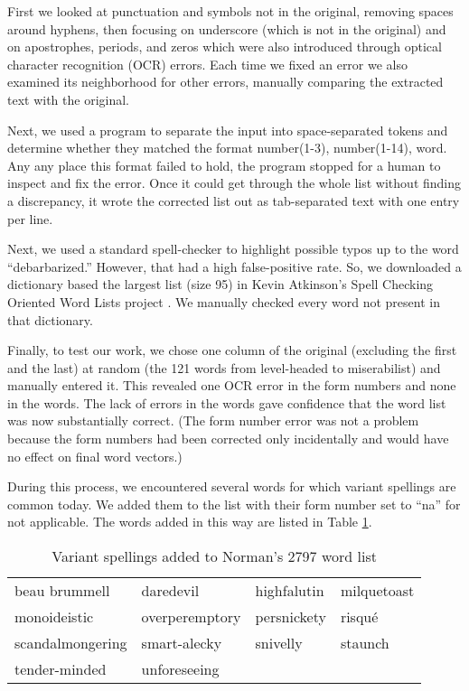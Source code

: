\documentclass[eric_thesis.tex]{subfiles}
\begin{document}
First we looked at
punctuation and symbols not in the original, removing spaces around hyphens, 
then focusing on underscore (which is not in the original) and on apostrophes, 
periods, and zeros which were also 
introduced through optical character recognition (OCR) errors. Each time we
fixed an error we also examined its neighborhood for other errors, manually
comparing the extracted text with the original. 

Next, we used a program to separate the input into space-separated tokens and
determine whether they matched the format number(1-3), number(1-14), word. Any
any place this format failed to hold, the program stopped for a human to 
inspect 
and fix the error. Once it could get through the whole list without finding a
discrepancy, it wrote the corrected list out as tab-separated text with one
entry per line.

Next, we used a standard spell-checker to highlight
possible typos up to the word ``debarbarized.'' However, that had a high 
false-positive rate. So, we downloaded
a dictionary based the largest list (size 95) in Kevin Atkinson's Spell 
Checking Oriented Word Lists project . We 
manually checked every word not present in that dictionary.

Finally, to test our work, we chose one column of the original (excluding the 
first and the last) at random (the 121 words from level-headed to miserabilist) 
and manually entered it. This revealed one OCR error in the form numbers and 
none in the words. The lack of errors in the words gave confidence that the 
word list was now substantially correct. (The form number error was not a 
problem because the form numbers had been corrected only incidentally and would 
have no effect on final word vectors.)

During this process, we encountered several words for which variant spellings
are common today. We added them to the list with their form number set to ``na''
for not applicable. The words added in this way are listed in Table 
\ref{tab:2797variantspellings}.

\begin{table}[tbp]
    \begin{tabular}{| llll |}
        \hline
        beau brummell & daredevil & highfalutin & milquetoast \\
        monoideistic & overperemptory & persnickety & risqué \\
        scandalmongering & smart-alecky & snivelly & staunch \\
        tender-minded & unforeseeing & & \\
     \hline
    \end{tabular}
    \caption{Variant spellings added to Norman's 2797 word list}
    \label{tab:2797variantspellings}
\end{table}
\end{document}
